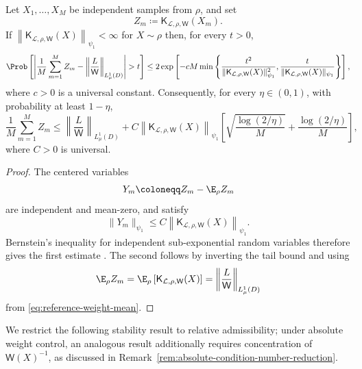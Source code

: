 \documentclass[10pt,dvipsnames]{amsart}
\begin{document}
\begin{lemma}
\label{lemma:reference-weight-empirical-concentration}
Let \(X_1,\ldots,X_M\) be independent samples from \(\rho\), and set
\[
    Z_m
    \coloneqq
    \mathsf K_{\mathcal L,\rho,\mathsf W}(X_m).
\]
If
\(
    \left\|
        \mathsf K_{\mathcal L,\rho,\mathsf W}(X)
    \right\|_{\psi_1}
    <\infty
\)
for \(X\sim \rho\) then, for every \(t>0\),
\[
    \Prob\left[
        \left|
            \frac1M\sum_{m=1}^M Z_m
            -
            \left\|
                \frac{L}{\mathsf W}
            \right\|_{L^1_\mu(D)}
        \right|
        >
        t
    \right]
    \leq
    2\exp\left[
        -cM
        \min\left\{
            \frac{
                t^2
            }{
                \|
                    \mathsf K_{\mathcal L,\rho,\mathsf W}(X)
                \|_{\psi_1}^2
            },
            \frac{
                t
            }{
                \|
                    \mathsf K_{\mathcal L,\rho,\mathsf W}(X)
                \|_{\psi_1}
            }
        \right\}
    \right],
\]
where \(c>0\) is a universal constant. Consequently, for every
\(\eta\in(0,1)\), with probability at least \(1-\eta\),
\[
    \frac1M\sum_{m=1}^M Z_m
    \leq
    \left\|
        \frac{L}{\mathsf W}
    \right\|_{L^1_\mu(D)}
    +
    C
    \left\|
        \mathsf K_{\mathcal L,\rho,\mathsf W}(X)
    \right\|_{\psi_1}
    \left[
        \sqrt{\frac{\log(2/\eta)}{M}}
        +
        \frac{\log(2/\eta)}{M}
    \right],
\]
where \(C>0\) is universal.
\end{lemma}

\begin{proof}
The centered variables
\[
    Y_m
    \coloneqq
    Z_m-\E_\rho Z_m
\]
are independent and mean-zero, and satisfy
\[
    \|Y_m\|_{\psi_1}
    \leq
    C
    \left\|
        \mathsf K_{\mathcal L,\rho,\mathsf W}(X)
    \right\|_{\psi_1}.
\]
Bernstein's inequality for independent sub-exponential random variables
therefore gives the first estimate
\cite{vershynin2019high}. The second follows by inverting the tail bound and
using
\[
    \E_\rho Z_m
    =
    \E_\rho\left[
        \mathsf K_{\mathcal L,\rho,\mathsf W}(X)
    \right]
    =
    \left\|
        \frac{L}{\mathsf W}
    \right\|_{L^1_\mu(D)}
\]
from \eqref{eq:reference-weight-mean}.
\end{proof}

We restrict the following stability result to relative admissibility; under absolute weight control, an analogous result additionally requires concentration of \(\mathsf W(X)^{-1}\), as discussed in Remark~\ref{rem:absolute-condition-number-reduction}.
\end{document}
